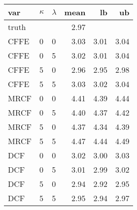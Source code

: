 \begin{tabular}{lllrrr}
  \hline
var & $\kappa$ & $\lambda$ & mean & lb & ub \\ 
  \hline
truth &  &  & 2.97 &  &  \\ 
  CFFE  & 0 & 0 & 3.03 & 3.01 & 3.04 \\ 
  CFFE  & 0 & 5 & 3.02 & 3.01 & 3.04 \\ 
  CFFE  & 5 & 0 & 2.96 & 2.95 & 2.98 \\ 
  CFFE  & 5 & 5 & 3.03 & 3.02 & 3.04 \\ 
  MRCF  & 0 & 0 & 4.41 & 4.39 & 4.44 \\ 
  MRCF  & 0 & 5 & 4.40 & 4.37 & 4.42 \\ 
  MRCF  & 5 & 0 & 4.37 & 4.34 & 4.39 \\ 
  MRCF  & 5 & 5 & 4.47 & 4.44 & 4.49 \\ 
  DCF  & 0 & 0 & 3.02 & 3.00 & 3.03 \\ 
  DCF  & 0 & 5 & 3.01 & 2.99 & 3.02 \\ 
  DCF  & 5 & 0 & 2.94 & 2.92 & 2.95 \\ 
  DCF  & 5 & 5 & 2.95 & 2.94 & 2.97 \\ 
   \hline
\end{tabular}
